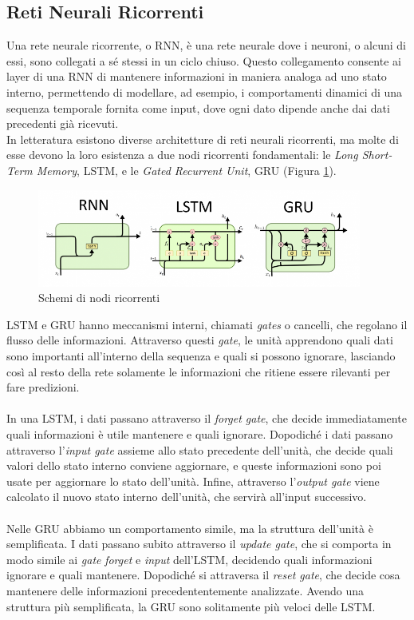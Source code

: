 \subsection{Reti Neurali Ricorrenti}
Una rete neurale ricorrente, o RNN, è una rete neurale dove i neuroni, o alcuni di essi, sono collegati a sé stessi in un ciclo chiuso. Questo collegamento consente ai layer di una RNN di mantenere informazioni in maniera analoga ad uno stato interno, permettendo di modellare, ad esempio, i comportamenti dinamici di una sequenza temporale fornita come input, dove ogni dato dipende anche dai dati precedenti già ricevuti.\\
In letteratura esistono diverse architetture di reti neurali ricorrenti, ma molte di esse devono la loro esistenza a due nodi ricorrenti fondamentali: le \textit{Long Short-Term Memory}, LSTM, e le \textit{Gated Recurrent Unit}, GRU (Figura \ref{fig:rnnlstmgru}). 
\begin{figure}[h]
	\begin{center}
		\includegraphics[width=0.95\textwidth]{img/rnnlstmgru.png}
		\caption{Schemi di nodi ricorrenti}
		\label{fig:rnnlstmgru}
	\end{center}
\end{figure}
LSTM e GRU hanno meccanismi interni, chiamati \textit{gates} o cancelli, che regolano il flusso delle informazioni. Attraverso questi \textit{gate}, le unità apprendono quali dati sono importanti all'interno della sequenza e quali si possono ignorare, lasciando così al resto della rete solamente le informazioni che ritiene essere rilevanti per fare predizioni.\\\\
In una LSTM, i dati passano attraverso il \textit{forget gate}, che decide immediatamente quali informazioni è utile mantenere e quali ignorare. Dopodiché i dati passano attraverso l'\textit{input gate} assieme allo stato precedente dell'unità, che decide quali valori dello stato interno conviene aggiornare, e queste informazioni sono poi usate per aggiornare lo stato dell'unità. Infine, attraverso l'\textit{output gate} viene calcolato il nuovo stato interno dell'unità, che servirà all'input successivo.\\\\
Nelle GRU abbiamo un comportamento simile, ma la struttura dell'unità è semplificata. I dati passano subito attraverso il \textit{update gate}, che si comporta in modo simile ai \textit{gate} \textit{forget} e \textit{input} dell'LSTM, decidendo quali informazioni ignorare e quali mantenere. Dopodiché si attraversa il \textit{reset gate}, che decide cosa mantenere delle informazioni precedententemente analizzate. Avendo una struttura più semplificata, la GRU sono solitamente più veloci delle LSTM.
